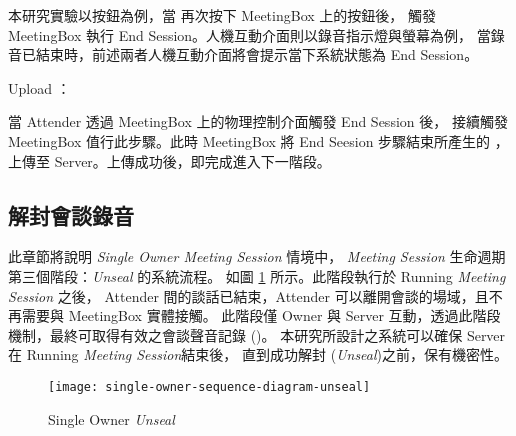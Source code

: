 \begin{steps}
            本研究實驗以按鈕為例，當 \DEFattender 再次按下 MeetingBox 上的按鈕後，
        觸發 MeetingBox 執行 End Session。人機互動介面則以錄音指示燈與螢幕為例，
        當錄音已結束時，前述兩者人機互動介面將會提示當下系統狀態為 End Session。

    \item Upload \DEFrecJ：

            當 Attender 透過 MeetingBox 上的物理控制介面觸發 End Session 後，
        接續觸發 MeetingBox 值行此步驟。此時 MeetingBox 將 End Seesion 步驟結束所產生的 \DEFrecJ，
        上傳至 Server。上傳成功後，即完成進入下一階段。
\end{steps}


\subsection{解封會談錄音}
\label{subsec.unseal}

    此章節將說明 {\it Single Owner Meeting Session} 情境中，
{\it Meeting Session} 生命週期第三個階段：{\it Unseal} 的系統流程。
如圖 \ref{fig:s-o-unseal} 所示。此階段執行於 Running {\it Meeting Session} 之後，
Attender 間的談話已結束，Attender 可以離開會談的場域，且不再需要與 MeetingBox 實體接觸。
此階段僅 Owner 與 Server 互動，透過此階段機制，最終可取得有效之會談聲音記錄 (\DEFrecREV)。
本研究所設計之系統可以確保 Server 在 Running {\it Meeting Session}結束後，
直到成功解封 ({\it Unseal})之前，\DEFrecREV 保有機密性。

\begin{figure}[H]
    \centering
    \texttt{[image: single-owner-sequence-diagram-unseal]}
    \caption{Single Owner {\it Unseal}}
    \label{fig:s-o-unseal}
\end{figure}

